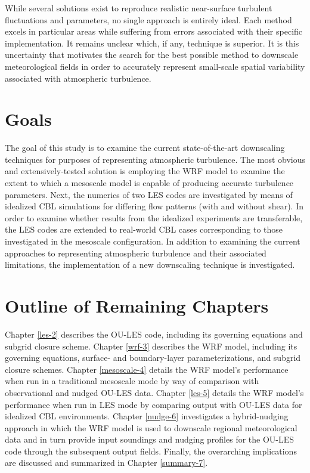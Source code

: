 While several solutions exist to reproduce realistic near-surface turbulent fluctuations and parameters, no single approach is entirely ideal. Each method excels in particular areas while suffering from errors associated with their specific implementation. It remains unclear which, if any, technique is superior. It is this uncertainty that motivates the search for the best possible method to downscale meteorological fields in order to accurately represent small-scale spatial variability associated with atmospheric turbulence. 

\section{Goals}
\label{goals-12}

The goal of this study is to examine the current state-of-the-art downscaling techniques for purposes of representing atmospheric turbulence. The most obvious and extensively-tested solution is employing the WRF model to examine the extent to which a mesoscale model is capable of producing accurate turbulence parameters. Next, the numerics of two LES codes are investigated by means of idealized CBL simulations for differing flow patterns (with and without shear). In order to examine whether results from the idealized experiments are transferable, the LES codes are extended to real-world CBL cases corresponding to those investigated in the mesoscale configuration. In addition to examining the current approaches to representing atmospheric turbulence and their associated limitations, the implementation of a new downscaling technique is investigated.

\section{Outline of Remaining Chapters}
\label{outline-13}

Chapter \autoref{les-2} describes the OU-LES code, including its governing equations and subgrid closure scheme. Chapter \autoref{wrf-3} describes the WRF model, including its governing equations, surface- and boundary-layer parameterizations, and subgrid closure schemes. Chapter \autoref{mesoscale-4} details the WRF model's performance when run in a traditional mesoscale mode by way of comparison with observational and nudged OU-LES data. Chapter \autoref{les-5} details the WRF model's performance when run in LES mode by comparing output with OU-LES data for idealized CBL environments. Chapter \autoref{nudge-6} investigates a hybrid-nudging approach in which the WRF model is used to downscale regional meteorological data and in turn provide input soundings and nudging profiles for the OU-LES code through the subsequent output fields. Finally, the overarching implications are discussed and summarized in Chapter \autoref{summary-7}.

